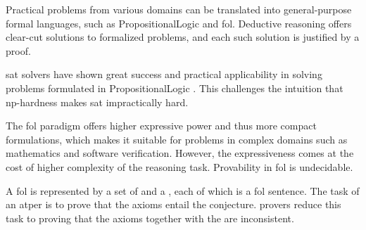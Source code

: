 Practical problems from various domains can be translated into general-purpose formal languages,
such as \gls{PropositionalLogic} and \gls{fol}.
Deductive reasoning offers clear-cut solutions to formalized problems,
and each such solution is justified by a proof.




\Gls{sat} solvers have shown great success and practical applicability in solving problems formulated in \gls{PropositionalLogic} \cite{DBLP:series/faia/336}.
This challenges the intuition that \acrshort{np}-hardness makes \gls{sat} impractically hard.

The \gls{fol} paradigm offers higher expressive power and thus more compact formulations,
which makes it suitable for problems in complex domains such as mathematics and software verification.
However, the expressiveness comes at the cost of higher complexity of the reasoning task.
Provability in \gls{fol} is undecidable.

A \gls{fol}  is represented by a set of  and a ,
each of which is a \gls{fol} sentence.
The task of an \gls{atper} is to prove that the axioms entail the conjecture.
 provers reduce this task to proving that the axioms together with the  are inconsistent.

